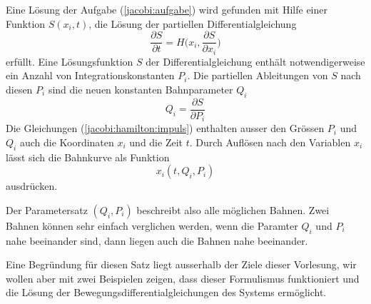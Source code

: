 \begin{satz}
\label{jacobi:satz}
Eine Lösung der Aufgabe (\ref{jacobi:aufgabe}) wird gefunden mit
Hilfe einer Funktion $S(x_i, t)$, die Lösung der partiellen
Differentialgleichung
\begin{equation}
\frac{\partial S}{\partial t}
=
H\biggl(
x_i,
\frac{\partial S}{\partial x_i}
\biggr)
\label{jacobi:hamilton:dgl}
\end{equation}
erfüllt.
Eine Lösungsfunktion $S$ der Differentialgleichung enthält notwendigerweise
ein Anzahl von Integrationskonstanten $P_i$.
Die partiellen Ableitungen von $S$ nach diesen $P_i$
sind die neuen konstanten Bahnparameter $Q_i$
\begin{equation}
Q_i=\frac{\partial S}{\partial P_i}
\label{jacobi:hamilton:impuls}
\end{equation}
Die Gleichungen (\ref{jacobi:hamilton:impuls}) enthalten ausser den
Grössen $P_i$ und $Q_i$ auch die Koordinaten $x_i$ und die Zeit $t$.
Durch Auflösen nach den Variablen $x_i$ lässt sich die Bahnkurve
als Funktion
\[
x_i(t,Q_i,P_i)
\]
ausdrücken.
\end{satz}
Der Parametersatz $(Q_i,P_i)$ beschreibt also alle möglichen 
Bahnen. Zwei Bahnen können sehr einfach verglichen werden, wenn die
Paramter $Q_i$ und $P_i$ nahe beeinander sind, dann liegen auch
die Bahnen nahe beeinander.

Eine Begründung für diesen Satz liegt ausserhalb der Ziele
dieser Vorlesung, wir wollen aber mit zwei Beispielen zeigen,
dass dieser Formulismus funktioniert und die Lösung der
Bewegungsdifferentialgleichungen des Systems ermöglicht.

